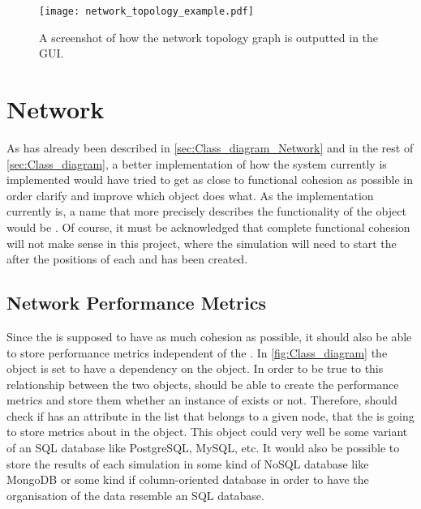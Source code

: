 \begin{figure}[h!]
  \centering
  \texttt{[image: network\_topology\_example.pdf]}
  \caption{A screenshot of how the network topology graph is outputted in the GUI.}
  \label{fig:network_topology_example}
\end{figure}


\section{Network}
As has already been described in \autoref{sec:Class_diagram_Network} and in the rest of \autoref{sec:Class_diagram}, a better implementation of how the system currently is implemented would have tried to get as close to functional cohesion as possible in order clarify and improve which object does what. As the implementation currently is, a name that more precisely describes the functionality of the  object would be . Of course, it must be acknowledged that complete functional cohesion will not make sense in this project, where the simulation will need to start the  after the positions of each  and  has been created.

\subsection{Network Performance Metrics}
Since the  is supposed to have as much cohesion as possible, it should also be able to store performance metrics independent of the . In \autoref{fig:Class_diagram} the object  is set to have a dependency on the  object. In order to be true to this relationship between the two objects,  should be able to create the performance metrics and store them whether an instance of  exists or not. Therefore,  should check if  has an attribute in the  list that belongs to a given node, that the  is going to store metrics about in the  object. This object could very well be some variant of an SQL database like PostgreSQL, MySQL, etc. It would also be possible to store the results of each simulation in some kind of NoSQL database like MongoDB or some kind if column-oriented database in order to have the organisation of the data resemble an SQL database.


